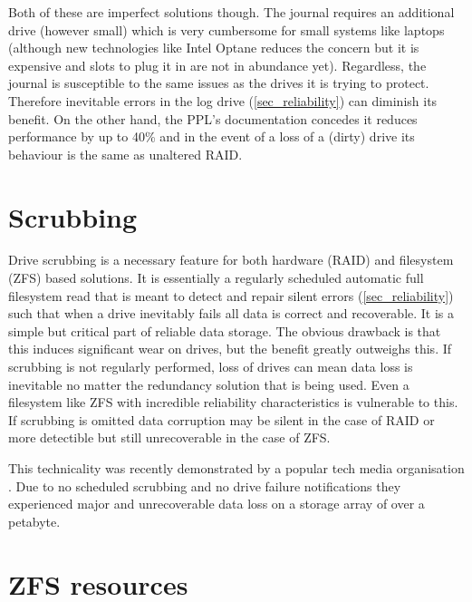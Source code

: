         Both of these are imperfect solutions though. The journal requires an
        additional drive (however small) which is very cumbersome for small
        systems like laptops (although new technologies like Intel Optane
        \cite{Intel_Optane} reduces the concern but it is expensive and slots
        to plug it in are not in abundance yet). Regardless, the journal is
        susceptible to the same issues as the drives it is trying to protect.
        Therefore inevitable errors in the log drive (\ref{sec_reliability})
        can diminish its benefit. On the other hand, the PPL's  documentation
        \cite{partial_parity_log} concedes it reduces performance by up to 40\%
        and in the event of a loss of a (dirty) drive its behaviour is the same
        as unaltered RAID.

    \section{Scrubbing}

        Drive scrubbing \cite{scrubbing} is a necessary feature for both
        hardware (RAID) and filesystem (ZFS) based solutions. It is essentially
        a regularly scheduled automatic full filesystem read that is meant to
        detect and repair silent errors (\ref{sec_reliability}) such that when
        a drive inevitably fails all data is correct and recoverable. It is a
        simple but critical part of reliable data storage. The obvious drawback
        is that this induces significant wear on drives, but the benefit
        greatly outweighs this. If scrubbing is not regularly performed, loss
        of drives can mean data loss is inevitable no matter the redundancy
        solution that is being used. Even a filesystem like ZFS with incredible
        reliability characteristics \cite{ZFS_reliability} is vulnerable to
        this. If scrubbing is omitted data corruption may be silent in the case
        of RAID or more detectible but still unrecoverable in the case of ZFS.

        This technicality was recently demonstrated by a popular tech media
        organisation \cite{LTT_data_loss}. Due to no scheduled scrubbing and no
        drive failure notifications they experienced major and unrecoverable
        data loss on a storage array of over a petabyte.

    \section{ZFS resources}

